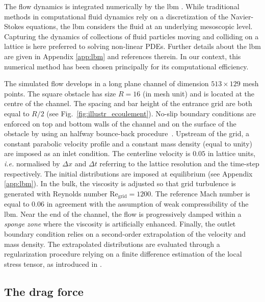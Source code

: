 \documentclass{jfm}
\newcommand{\EL}[1]{{\color{myred}{#1}}}
\begin{document}
%
The flow dynamics is integrated numerically by the \ac{lbm} \EL{\citep{book_lbm}}. 
While traditional methods in computational fluid dynamics rely on a discretization of the Navier-Stokes equations, the \ac{lbm} considers the fluid at an underlying  mesoscopic level.
Capturing the dynamics of collections of fluid particles moving and colliding on a lattice is here preferred to solving non-linear PDEs. 
Further details about the \ac{lbm} are given in Appendix \ref{app:lbm} and references therein.
In our context, this numerical method has been chosen principally for its computational efficiency. 


%
The simulated flow develops in a long plane channel of dimension $513 \times 129$ mesh points. The square obstacle has size $R=16$ (in mesh unit) and is located at the centre of the channel. The spacing and bar height of the entrance grid are both equal to $R/2$ (see Fig.~\ref{fig:illustr_ecoulement}). 
%
No-slip boundary conditions are enforced on top and bottom walls of the channel and on the surface of the obstacle by using an halfway bounce-back procedure~\citep{lbm_book}.  
%
Upstream of the grid, a constant parabolic velocity profile and a constant mass density (equal to unity) are imposed as an inlet condition. 
The centerline velocity is $0.05$ in lattice units, \textit{i.e.} normalised by $\Delta x$ and $\Delta t$ referring to the lattice resolution and the time-step respectively. The initial distributions are imposed at equilibrium (see Appendix \ref{app:lbm}). 
In the bulk, the viscosity is adjusted so that grid turbulence is generated with Reynolds number $\mathrm{Re_{grid}}=1200$. The reference Mach number is equal to $0.06$ in agreement with the assumption of weak compressibility of the \ac{lbm}. 
Near the end of the channel, the flow is progressively damped within a \textit{sponge zone} where the viscosity is artificially enhanced.
Finally, the outlet boundary condition relies on a second-order extrapolation of the velocity and mass density.
The extrapolated distributions are evaluated through a regularization procedure relying on a finite difference estimation of the local stress tensor, as introduced in \cite{latt2008straight}. 


\subsection{The drag force}
\label{sec:drag_force}
\end{document}
